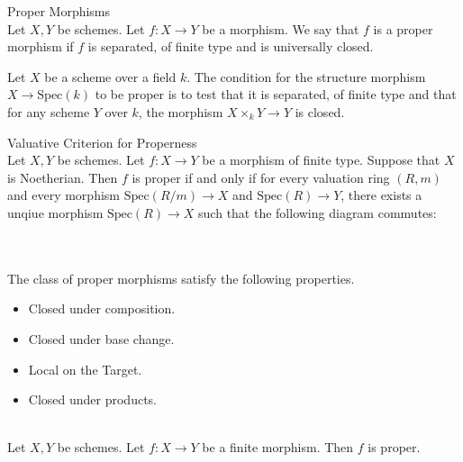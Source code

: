 \documentclass[a4paper]{article}
\begin{document}
\begin{defn}{Proper Morphisms}{}\\
Let $X,Y$ be schemes. Let $f:X\to Y$ be a morphism. We say that $f$ is a proper morphism if $f$ is separated, of finite type and is universally closed. 
\end{defn}

Let $X$ be a scheme over a field $k$. The condition for the structure morphism $X\to\text{Spec}(k)$ to be proper is to test that it is separated, of finite type and that for any scheme $Y$ over $k$, the morphism $X\times_kY\to Y$ is closed. 

\begin{thm}{Valuative Criterion for Properness}{}\\
Let $X,Y$ be schemes. Let $f:X\to Y$ be a morphism of finite type. Suppose that $X$ is Noetherian. Then $f$ is proper if and only if for every valuation ring $(R,m)$ and every morphism $\text{Spec}(R/m)\to X$ and $\text{Spec}(R)\to Y$, there exists a unqiue morphism $\text{Spec}(R)\to X$ such that the following diagram commutes: \\
 \\
\end{thm}

\begin{lmm}{}{}\\
The class of proper morphisms satisfy the following properties. 
\begin{itemize}
\item Closed under composition. 
\item Closed under base change. 
\item Local on the Target. 
\item Closed under products. 
\end{itemize}
\end{lmm}

\begin{prp}{}{}\\
Let $X,Y$ be schemes. Let $f:X\to Y$ be a finite morphism. Then $f$ is proper. 
\end{prp}
\end{document}
